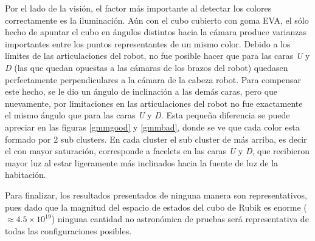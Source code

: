 Por el lado de la visión, el factor más importante al detectar los colores correctamente es la iluminación. Aún con el cubo cubierto con goma EVA, el sólo hecho de apuntar el cubo en ángulos distintos hacia la cámara produce varianzas importantes entre los puntos representantes de un mismo color. Debido a los límites de las articulaciones del robot, no fue posible hacer que para las caras \emph{U} y \emph{D} (las que quedan opuestas a las cámaras de los brazos del robot) quedasen perfectamente perpendiculares a la cámara de la cabeza robot. Para compensar este hecho, se le dio un ángulo de inclinación a las demás caras, pero que nuevamente, por limitaciones en las articulaciones del robot no fue exactamente el mismo ángulo que para las caras \emph{U} y \emph{D}. Esta pequeña diferencia se puede apreciar en las figuras \ref{gmmgood} y \ref{gmmbad}, donde se ve que cada color esta formado por 2 sub clusters. En cada cluster el sub cluster de más arriba, es decir el con mayor saturación, corresponde a facelets en las caras \emph{U} y \emph{D}, que recibieron mayor luz al estar ligeramente más inclinados hacia la fuente de luz de la habitación.

Para finalizar, los resultados presentados de ninguna manera son representativos, pues dado que la magnitud del espacio de estados del cubo de Rubik es enorme ($\approx 4.5\times 10^{19}$) ninguna cantidad no astronómica de pruebas será representativa de todas las configuraciones posibles.
